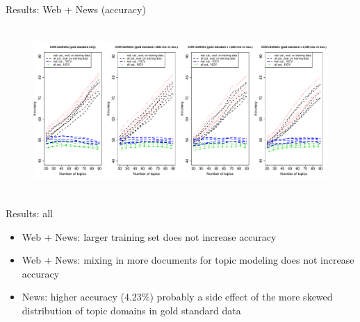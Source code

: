 \documentclass{beamer}
\begin{document}
\begin{frame}
  {Results: Web + News (accuracy)}
  \begin{figure}
    \centering
    \includegraphics[width=\textwidth, height=6.4cm]{graphics/acc_coreko.pdf}
  \end{figure}
  \vspace{-.3cm}
  \centering
\end{frame}



\begin{frame}
  {Results: all}
  \centering

\vspace{.5cm}

  \begin{itemize}
    \item \alert{Web + News}: larger training set does not increase accuracy
    \item \alert{Web + News}: mixing in more documents for topic modeling does not increase accuracy
    \item \alert{News}: higher accuracy (4.23\%) probably a side effect of the more skewed distribution of topic domains in gold standard data
  \end{itemize}
\end{frame}
\end{document}

